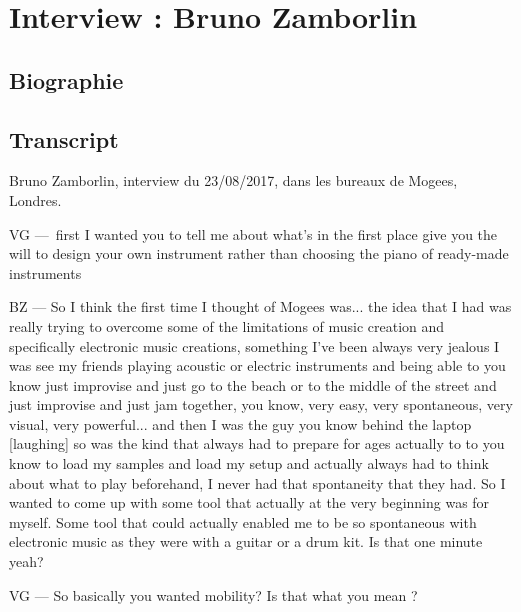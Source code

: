 \chapter{Interview : Bruno Zamborlin}
\label{appendix:zamborlin}

\section*{Biographie}


\section*{Transcript}

Bruno Zamborlin, interview du 23/08/2017, dans les bureaux de Mogees, Londres.

VG — first I wanted you to tell me about what's in the first place give you the will to design your own instrument rather than choosing the piano of ready-made instruments 

BZ — So I think the first time I thought of Mogees was... the idea that I had was really trying to overcome some of the limitations of music creation and specifically electronic music creations, something I've been always very jealous I was see my friends playing acoustic or electric instruments and being able to you know just improvise and just go to the beach or to the middle of the street and just improvise and just jam together, you know, very easy, very spontaneous, very visual, very powerful... and then I was the guy you know behind the laptop [laughing] so was the kind that always had to prepare for ages actually to to you know to load my samples and load my setup and actually always had to think about what to play beforehand, I never had that spontaneity that they had. So I wanted to come up with some tool that actually at the very beginning was for myself. Some tool that could actually enabled me to be so spontaneous with electronic music as they were with a guitar or a drum kit. Is that one minute yeah? 

VG — So basically you wanted mobility? Is that what you mean ?

